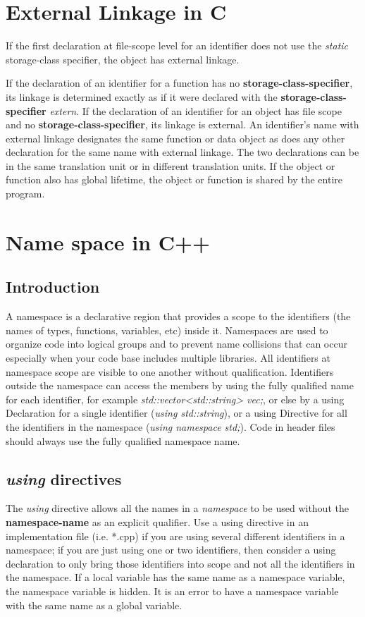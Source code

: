 \documentclass[a4paper]{report}
\begin{document}
\section{External Linkage in C}
If the first declaration at file-scope level for an identifier does not use the \emph{static} storage-class specifier, the object has external linkage.
\par
If the declaration of an identifier for a function has no \textbf{storage-class-specifier}, its linkage is determined exactly as if it were declared with the \textbf{storage-class-specifier} \emph{extern}. If the declaration of an identifier for an object has file scope and no \textbf{storage-class-specifier}, its linkage is external.
An identifier's name with external linkage designates the same function or data object as does any other declaration for the same name with external linkage. The two declarations can be in the same translation unit or in different translation units. If the object or function also has global lifetime, the object or function is shared by the entire program.
\section{Name space in C++}
\subsection{Introduction}
A namespace is a declarative region that provides a scope to the identifiers (the names of types, functions, variables, etc) inside it. Namespaces are used to organize code into logical groups and to prevent name collisions that can occur especially when your code base includes multiple libraries. All identifiers at namespace scope are visible to one another without qualification. Identifiers outside the namespace can access the members by using the fully qualified name for each identifier, for example \emph{std::vector<std::string> vec;}, or else by a using Declaration for a single identifier (\emph{using std::string}), or a using Directive for all the identifiers in the namespace (\emph{using namespace std;}). Code in header files should always use the fully qualified namespace name.
\subsection{\emph{using} directives}
The \emph{using} directive allows all the names in a \emph{namespace} to be used without the \textbf{namespace-name} as an explicit qualifier. Use a using directive in an implementation file (i.e. *.cpp) if you are using several different identifiers in a namespace; if you are just using one or two identifiers, then consider a using declaration to only bring those identifiers into scope and not all the identifiers in the namespace. If a local variable has the same name as a namespace variable, the namespace variable is hidden. It is an error to have a namespace variable with the same name as a global variable.
\end{document}
